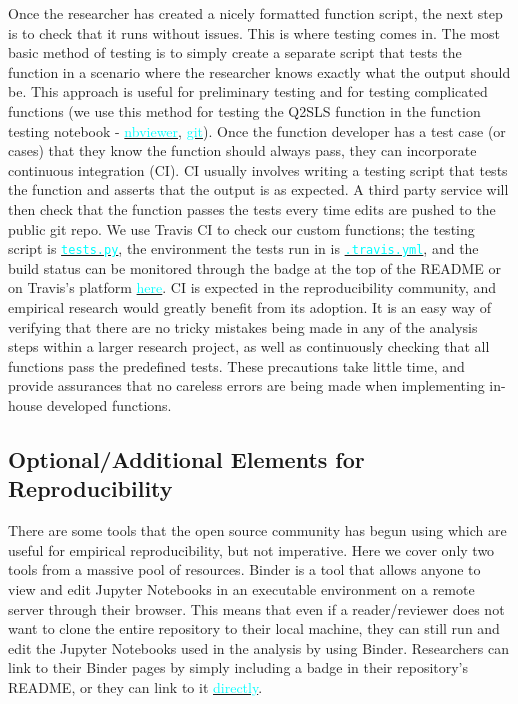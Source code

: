 \documentclass[12pt]{article}
\newcommand{\inlinecode}{\texttt}
\begin{document}
Once the researcher has created a nicely formatted function script, the next step is to check that it runs without issues. This is where testing comes in. The most basic method of testing is to simply create a separate script that tests the function in a scenario where the researcher knows exactly what the output should be. This approach is useful for preliminary testing and for testing complicated functions (we use this method for testing the Q2SLS function in the function testing notebook - \href{https://nbviewer.jupyter.org/github/nadavtadelis/Reproducible_Metrics/blob/master/function_testing.ipynb}{\textcolor{cyan}{nbviewer}}, \href{https://github.com/nadavtadelis/Reproducible_Metrics/blob/master/function_testing.ipynb}{\textcolor{cyan}{git}}). Once the function developer has a test case (or cases) that they know the function should always pass, they can incorporate continuous integration (CI). CI usually involves writing a testing script that tests the function and asserts that the output is as expected. A third party service will then check that the function passes the tests every time edits are pushed to the public git repo. We use Travis CI to check our custom functions; the testing script is \href{https://github.com/nadavtadelis/Reproducible_Metrics/blob/master/tests.py}{\textcolor{cyan}{\inlinecode{tests.py}}}, the environment the tests run in is \href{https://github.com/nadavtadelis/Reproducible_Metrics/blob/master/.travis.yml}{\textcolor{cyan}{\inlinecode{.travis.yml}}}, and the build status can be monitored through the badge at the top of the README or on Travis's platform \href{https://travis-ci.org/nadavtadelis/Reproducible_Metrics}{\textcolor{cyan}{here}}. CI is expected in the reproducibility community, and empirical research would greatly benefit from its adoption. It is an easy way of verifying that there are no tricky mistakes being made in any of the analysis steps within a larger research project, as well as continuously checking that all functions pass the predefined tests. These precautions take little time, and provide assurances that no careless errors are being made when implementing in-house developed functions.

\subsection{Optional/Additional Elements for Reproducibility}
There are some tools that the open source community has begun using which are useful for empirical reproducibility, but not imperative. Here we cover only two tools from a massive pool of resources. Binder is a tool that allows anyone to view and edit Jupyter Notebooks in an executable environment on a remote server through their browser. This means that even if a reader/reviewer does not want to clone the entire repository to their local machine, they can still run and edit the Jupyter Notebooks used in the analysis by using Binder. Researchers can link to their Binder pages by simply including a badge in their repository's README, or they can link to it \href{https://mybinder.org/v2/gh/nadavtadelis/Reproducible_Metrics/master}{\textcolor{cyan}{directly}}. 
\end{document}
